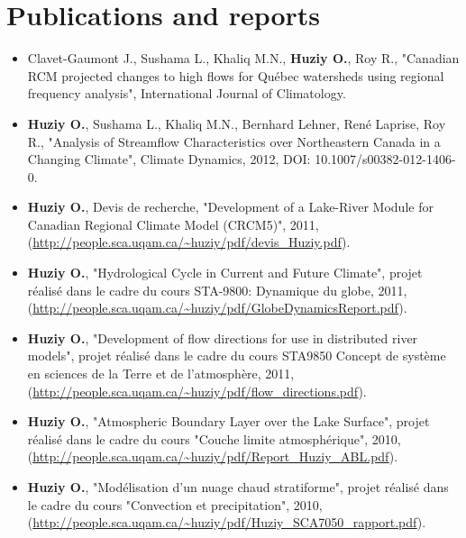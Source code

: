 \documentclass[12pt,a4paper,sans]{moderncv}
\begin{document}
\section*{Publications and reports}
\vspace{0.5cm}
\begin{itemize}

    \item Clavet-Gaumont J., Sushama L., Khaliq M.N.,
    \textbf{Huziy O.}, Roy R., "Canadian RCM projected changes to high
    flows for Québec watersheds using regional frequency analysis", International Journal of Climatology.

    \item \textbf{Huziy O.}, Sushama L., Khaliq M.N., Bernhard
    Lehner, René Laprise, Roy R., "Analysis of Streamflow Characteristics over Northeastern Canada
     in a Changing Climate", Climate Dynamics, 2012, DOI:
     10.1007/s00382-012-1406-0.


    \item \textbf{Huziy O.}, Devis de recherche, "Development of a
    Lake-River Module for Canadian Regional Climate Model (CRCM5)", 2011,
    (\url{http://people.sca.uqam.ca/~huziy/pdf/devis_Huziy.pdf}).

    \item \textbf{Huziy O.}, "Hydrological Cycle in Current and Future Climate",
    projet réalisé dans le cadre du cours STA-9800: Dynamique du globe, 2011,\\
     (\url{http://people.sca.uqam.ca/~huziy/pdf/GlobeDynamicsReport.pdf}).

    \item \textbf{Huziy O.}, "Development of flow directions for use in
    distributed river models", projet réalisé dans le cadre du cours STA9850
    Concept de système en sciences de la Terre et de l'atmosphère, 2011,
    (\url{http://people.sca.uqam.ca/~huziy/pdf/flow_directions.pdf}).

    \item \textbf{Huziy O.}, "Atmospheric Boundary Layer over the Lake Surface",
           projet réalisé dans le cadre du cours "Couche limite atmosphérique",
           2010, (\url{http://people.sca.uqam.ca/~huziy/pdf/Report_Huziy_ABL.pdf}).

    \item \textbf{Huziy O.}, "Modélisation d’un nuage chaud stratiforme",
       projet réalisé dans le cadre du cours "Convection et precipitation", 2010,
       (\url{http://people.sca.uqam.ca/~huziy/pdf/Huziy_SCA7050_rapport.pdf}).


\end{itemize}
\end{document}
